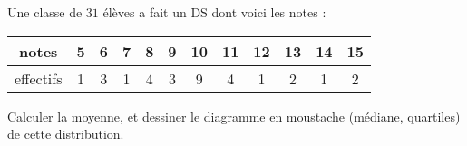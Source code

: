 
\begin{exercice}\label{exoSeconde-0032}

    Une classe de \( 31\) élèves a fait un DS dont voici les notes :

    \begin{center}
    \begin{tabular}{|c||c|c|c|c|c|c|c|c|c|c|c|}
        \hline
        notes&5&6&7&8&9&10&11&12&13&14&15\\
        \hline
        effectifs&1&3&1&4&3&9&4&1&2&1&2\\
        \hline
    \end{tabular}
    \end{center}

    Calculer la moyenne, et dessiner le diagramme en moustache (médiane, quartiles) de cette distribution.


\end{exercice}
